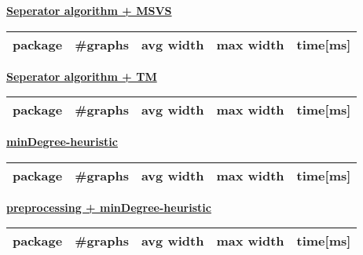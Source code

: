 \documentclass[a4wide]{article}
\begin{document}
\begin{minipage}{0.2\textwidth}
\underline{\textbf{Seperator algorithm + MSVS}} \\
\small{
\begin{tabular}{|l|l|l|l|l|}
\hline
package & \#graphs & avg width & max width & time[ms] \\
\hline
\hline

\hline
\end{tabular}
}
\end{minipage}
\hspace{6.5cm}
\begin{minipage}{0.2\textwidth}
\underline{\textbf{Seperator algorithm + TM}} \\
\small{
\begin{tabular}{|l|l|l|l|l|}
\hline
package & \#graphs & avg width & max width & time[ms] \\
\hline
\hline

\hline
\end{tabular}
}
\end{minipage}

\vspace*{0.5cm}

\begin{minipage}{0.2\textwidth}
\underline{\textbf{minDegree-heuristic}} \\
\small{
\begin{tabular}{|l|l|l|l|l|}
\hline
package & \#graphs & avg width & max width & time[ms] \\
\hline
\hline

\hline
\end{tabular}
}
\end{minipage}
\hspace{6.5cm}
\begin{minipage}{0.2\textwidth}
\underline{\textbf{preprocessing + minDegree-heuristic}} \\
\small{
\begin{tabular}{|l|l|l|l|l|}
\hline
package & \#graphs & avg width & max width & time[ms] \\
\hline
\hline

\hline
\end{tabular}
}
\end{minipage}

\vspace*{0.5cm}
\end{document}
